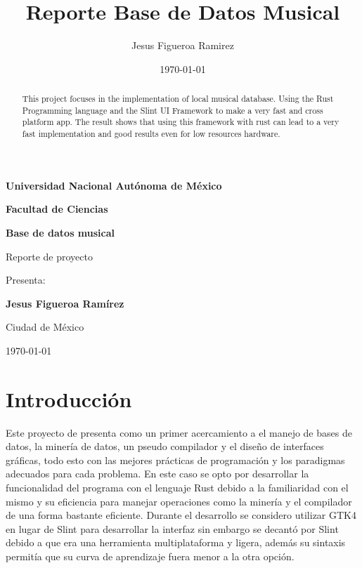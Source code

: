 \documentclass[12pt,a4paper]{article}
\title{Reporte Base de Datos Musical}
\author{Jesus Figueroa Ramirez}
\date{\today}
\begin{document}
\begin{titlepage}
    \centering
    {\LARGE \textbf{Universidad Nacional Autónoma de México} \par} 
    \vspace{0.5cm}
    {\Large \textbf{Facultad de Ciencias} \par}
    \vspace{3cm} 
    {\Huge \textbf{Base de datos musical} \par}
    \vspace{1cm}
    {\Large Reporte de proyecto \par}
    \vspace{4cm}
    {\Large Presenta: \par}
    \vspace{0.5cm}
    {\Large \textbf{Jesus Figueroa Ramírez} \par} 
    \vfill 
    {\large Ciudad de México \par} 
    {\large \today \par}
    
\end{titlepage}
    

\begin{abstract}
This project focuses in the implementation of local musical database. Using the Rust Programming language
and the Slint UI Framework to make a very fast and cross platform app. The result shows that 
using this framework with rust can lead to a very fast implementation and good results even for low
resources hardware.
\end{abstract}

\section{Introducción}
Este proyecto de presenta como un primer acercamiento a el manejo de bases de datos, la minería de datos, 
un pseudo compilador y el diseño de interfaces gráficas, todo esto con las mejores prácticas de programación
y los paradigmas adecuados para cada problema. En este caso se opto por desarrollar la funcionalidad 
del programa con el lenguaje Rust debido a la familiaridad con el mismo y su eficiencia para manejar
operaciones como la minería y el compilador de una forma bastante eficiente. Durante el desarrollo se 
considero utilizar GTK4 en lugar de Slint para desarrollar la interfaz sin embargo se decantó por Slint 
debido a que era una herramienta multiplataforma y ligera, además su sintaxis permitía que su curva de 
aprendizaje fuera menor a la otra opción.
\end{document}
